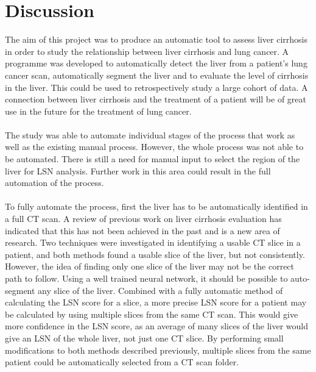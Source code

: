 \documentclass[12pt]{article}
\begin{document}
\section{Discussion}
The aim of this project was to produce an automatic tool to assess liver cirrhosis in order to study the relationship between liver cirrhosis and lung cancer. A programme was developed to automatically detect the liver from a patient's lung cancer scan, automatically segment the liver and to evaluate the level of cirrhosis in the liver. This could be used to retrospectively study a large cohort of data. A connection between liver cirrhosis and the treatment of a patient will be of great use in the future for the treatment of lung cancer. 
\\ \\
The study was able to automate individual stages of the process that work as well as the existing manual process. However, the whole process was not able to be automated.  There is still a need for manual input to select the region of the liver for LSN analysis.  Further work in this area could result in the full automation of the process. 
\\ \\
To fully automate the process, first the liver has to be automatically identified in a full CT scan. A review of previous work on liver cirrhosis evaluation has indicated that this has not been achieved in the past and is a new area of research. Two techniques were investigated in identifying a usable CT slice in a patient, and both methods found a usable slice of the liver, but not consistently. However, the idea of finding only one slice of the liver may not be the correct path to follow. Using a well trained neural network, it should be possible to auto-segment any slice of the liver. Combined with a fully automatic method of calculating the LSN score for a slice, a more precise LSN score for a patient may be calculated by using multiple slices from the same CT scan. This would give more confidence in the LSN score, as an average of many slices of the liver would give an LSN of the whole liver, not just one CT slice. By performing small modifications to both methods described previously, multiple slices from the same patient could be automatically selected from a CT scan folder.
\\ \\
\end{document}
